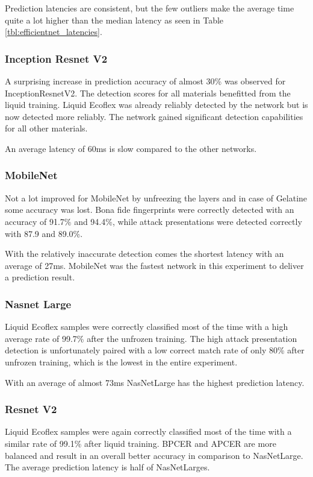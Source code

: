 Prediction latencies are consistent, but the few outliers make the average time quite a lot higher than the median latency as seen in Table \ref{tbl:efficientnet_latencies}.



\subsubsection{Inception Resnet V2}
A surprising increase in prediction accuracy of almost 30\% was observed for InceptionResnetV2.
The detection scores for all materials benefitted from the liquid training.
Liquid Ecoflex was already reliably detected by the network but is now detected more reliably.
The network gained significant detection capabilities for all other materials.

An average latency of 60ms is slow compared to the other networks.



\subsubsection{MobileNet}
Not a lot improved for MobileNet by unfreezing the layers and in case of Gelatine some accuracy was lost.
Bona fide fingerprints were correctly detected with an accuracy of 91.7\% and 94.4\%, while attack presentations were detected correctly with 87.9 and 89.0\%.

With the relatively inaccurate detection comes the shortest latency with an average of 27ms.
MobileNet was the fastest network in this experiment to deliver a prediction result.



\subsubsection{Nasnet Large}
Liquid Ecoflex samples were correctly classified most of the time with a high average rate of 99.7\% after the unfrozen training.
The high attack presentation detection is unfortunately paired with a low correct match rate of only 80\% after unfrozen training, which is the lowest in the entire experiment.

With an average of almost 73ms NasNetLarge has the highest prediction latency.



\subsubsection{Resnet V2}
Liquid Ecoflex samples were again correctly classified most of the time with a similar rate of 99.1\% after liquid training.
BPCER and APCER are more balanced and result in an overall better accuracy in comparison to NasNetLarge.
The average prediction latency is half of NasNetLarges.

